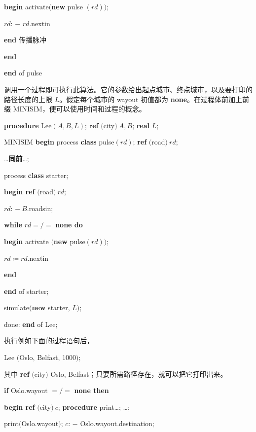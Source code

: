 \quad \quad \quad \textbf{begin} activate$($\textbf{new} pulse $(rd));$

\quad \quad \quad \quad $rd$: $-$ $rd$.nextin

\quad \quad \quad \textbf{end} 传播脉冲

\quad \quad \textbf{end}

\quad \textbf{end} of pulse

调用一个过程即可执行此算法。它的参数给出起点城市、终点城市，以及要打印的路径长度的上限 $L$。假定每个城市的 wayout 初值都为 \textbf{none}。在过程体前加上前缀 MINISIM，便可以使用时间和过程的概念。

\quad \textbf{procedure} Lee$(A, B, L)$; \textbf{ref} $($city$)\ A, B$; \textbf{real} $L$;

\quad \quad MINISIM \textbf{begin} process \textbf{class} pulse$(rd)$; \textbf{ref} $($road$)\ rd$;

\quad \quad \quad \dots \textbf{同前}\dots;

\quad \quad \quad process \textbf{class} starter;

\quad \quad \quad \quad \textbf{begin ref} $($road$)\ rd$;

\quad \quad \quad \quad \quad $rd$: $-\ B$.roadsin;

\quad \quad \quad \quad \quad \textbf{while} $rd =/=$ \textbf{none do}

\quad \quad \quad \quad \quad \quad \textbf{begin} activate $($\textbf{new} pulse$(rd))$;

\quad \quad \quad \quad \quad \quad \quad \quad $rd \coloneq rd$.nextin

\quad \quad \quad \quad \quad \quad \textbf{end}

\quad \quad \quad \quad \textbf{end} of starter;

\quad \quad \quad \quad simulate$($\textbf{new} starter, $L)$;

\quad \quad done: \textbf{end} of Lee;

\noindent
执行例如下面的过程语句后，

\quad Lee $($Oslo, Belfast, 1000$)$;

\noindent
其中 \textbf{ref} $($city$)$ Oslo, Belfast；只要所需路径存在，就可以把它打印出来。

\quad \textbf{if} Oslo.wayout $=/=$ \textbf{none then}

\quad \textbf{begin ref} $($city$)\ c$; \textbf{procedure} print\dots; \dots;

\quad \quad print$($Oslo.wayout$)$; $c$: $-$ Oslo.wayout.destination;

